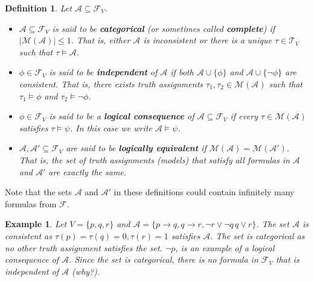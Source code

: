 \documentclass[a4paper,11pt]{article}
\newtheorem{definition}{Definition}
\newtheorem{example}{Example}
\begin{document}

\begin{definition}
Let $\mathcal{A}\subseteq \mathcal{F}_V$.  
\begin{itemize}

\item $\mathcal{A}\subseteq \mathcal{F}_V$ is said to be {\bf categorical} 
(or sometimes called {\bf complete}) if $|\mathcal{M(A)}|\leq 1$.  That is, either $\mathcal{A}$ is 
inconsistent or there is a unique $\tau\in \mathcal{T}_V$ such that $\tau\models \mathcal{A}$.

\item $\phi \in \mathcal{F}_V$ is said to be {\bf independent} of $\mathcal{A}$
if both $\mathcal{A}\cup \{\phi\}$ and $\mathcal{A}\cup \{\neg \phi\}$ are consistent.  That is, there
exists truth assignments $\tau_1, \tau_2 \in \mathcal{M(A)}$ such that 
$\tau_1\models \phi$ and $\tau_2\models \neg \phi$.  

\item $\phi \in \mathcal{F}_V$ is said to be a {\bf logical consequence} of 
$\mathcal{A}\subseteq \mathcal{F}_V$ if every $\tau\in \mathcal{M(A)}$ satisfies $\tau\models \psi$.  
In this case we write $\mathcal{A}\models\psi$.  

\item $\mathcal{A,A'}\subseteq \mathcal{F}_V$ are said to be {\bf logically equivalent} if 
$\mathcal{M(A)}=\mathcal{M(A')}$.  That is, the set of truth assignments (models) that satisfy
all formulas in $\mathcal{A}$ and $\mathcal{A'}$ are exactly the same.  

\end{itemize}
\end{definition}




Note that the sets $\mathcal{A}$ and $\mathcal{A'}$ in these definitions could contain infinitely
many formulas from $\mathcal{F}$.  

\begin{example}
Let $V=\{p,q,r\}$ and $\mathcal{A}=\{p\rightarrow q, q\rightarrow r, \neg r\vee \neg q\, q\vee r\}$.
The set $\mathcal{A}$ is consistent as $\tau(p)=\tau(q)=0, \tau(r)=1$ satisfies $\mathcal{A}$.  
The set is categorical as no other truth assignment satisfies the set.  $\neg p$, is an example
of a logical consequence of $\mathcal{A}$.  Since the set is categorical, there is no formula 
in $\mathcal{F}_V$ that is independent of $\mathcal{A}$ (why?).  
\end{example}
\end{document}
